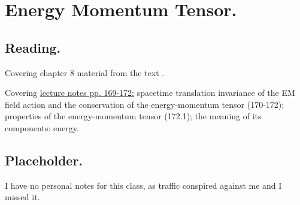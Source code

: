 %
%

\chapter{Energy Momentum Tensor.}
\label{chap:relativisticElectrodynamicsL22}
{}
\date{Mar 23, 2011}

\beginArtNoToc

\section{Reading.}

Covering chapter 8 material from the text \cite{landau1980classical}.

Covering \href{http://www.physics.utoronto.ca/~poppitz/epoppitz/PHY450_files/RelEMpp166-180.pdf}{lecture notes pp. 169-172:} spacetime translation invariance of the EM field action and the conservation of the energy-momentum tensor (170-172); properties of the energy-momentum tensor (172.1); the meaning of its components: energy.

\section{Placeholder.}

I have no personal notes for this class, as traffic conspired against me and I missed it.  

\EndArticle
